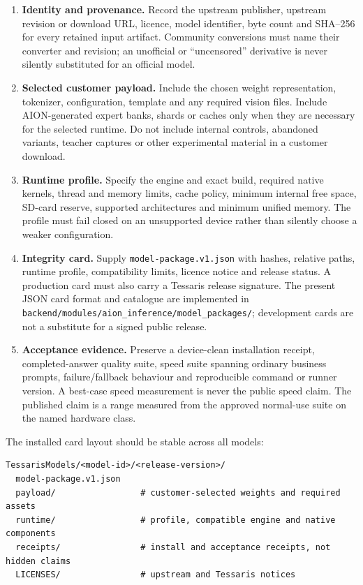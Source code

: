 \begin{enumerate}
  \item \textbf{Identity and provenance.}  Record the upstream publisher,
  upstream revision or download URL, licence, model identifier, byte count and
  SHA--256 for every retained input artifact.  Community conversions must name
  their converter and revision; an unofficial or ``uncensored'' derivative is
  never silently substituted for an official model.
  \item \textbf{Selected customer payload.}  Include the chosen weight
  representation, tokenizer, configuration, template and any required vision
  files.  Include AION-generated expert banks, shards or caches only when they
  are necessary for the selected runtime.  Do not include internal controls,
  abandoned variants, teacher captures or other experimental material in a
  customer download.
  \item \textbf{Runtime profile.}  Specify the engine and exact build,
  required native kernels, thread and memory limits, cache policy, minimum
  internal free space, SD-card reserve, supported architectures and minimum
  unified memory.  The profile must fail closed on an unsupported device rather
  than silently choose a weaker configuration.
  \item \textbf{Integrity card.}  Supply \texttt{model-package.v1.json} with
  hashes, relative paths, runtime profile, compatibility limits, licence notice
  and release status.  A production card must also carry a Tessaris release
  signature.  The present JSON card format and catalogue are implemented in
  \texttt{backend/modules/aion\_inference/model\_packages/}; development cards
  are not a substitute for a signed public release.
  \item \textbf{Acceptance evidence.}  Preserve a device-clean installation
  receipt, completed-answer quality suite, speed suite spanning ordinary
  business prompts, failure/fallback behaviour and reproducible command or
  runner version.  A best-case speed measurement is never the public speed
  claim.  The published claim is a range measured from the approved normal-use
  suite on the named hardware class.
\end{enumerate}

The installed card layout should be stable across all models:

\begin{verbatim}
TessarisModels/<model-id>/<release-version>/
  model-package.v1.json
  payload/                 # customer-selected weights and required assets
  runtime/                 # profile, compatible engine and native components
  receipts/                # install and acceptance receipts, not hidden claims
  LICENSES/                # upstream and Tessaris notices
\end{verbatim}

